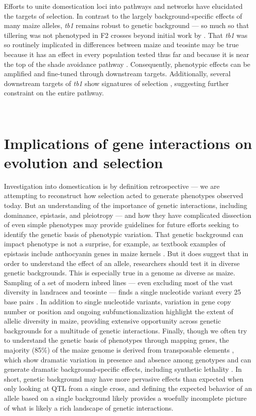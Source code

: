 \documentclass[9pt,twocolumn,twoside]{rilabRxiv}
\begin{document}
﻿Efforts to unite domestication loci into pathways and networks have elucidated the targets of selection.
In contrast to the largely background-specific effects of many maize alleles, \textit{tb1} remains robust to genetic background --- so much so that tillering was not phenotyped in F2 crosses beyond initial work by \citet{doebley1991}.
﻿That  \textit{tb1} was so routinely implicated in differences between maize and teosinte may be true because it has an effect in every population tested thus far and because it is near the top of the shade avoidance pathway \citep{studer2017}.
﻿Consequently, phenotypic effects can be amplified and fine-tuned through downstream targets.
Additionally, several downstream targets of \textit{tb1} show signatures of selection \citep{studer2017}, suggesting further constraint on the entire pathway.

﻿\section*{Implications of gene interactions on evolution and selection}

﻿Investigation into domestication is by definition retrospective --- we are attempting to reconstruct how selection acted to generate phenotypes observed today.
But an understanding of the importance of genetic interactions, including dominance, epistasis, and pleiotropy --- and how they have complicated dissection of even simple phenotypes may provide guidelines for future efforts seeking to identify the genetic basis of phenotypic variation.
That genetic background can impact phenotype is not a surprise, for example, as textbook examples of epistasis include anthocyanin genes in maize kernels \citep{coe1988}.
But it does suggest that in order to understand the effect of an allele, researchers should test it in diverse genetic backgrounds.
This is especially true in a genome as diverse as maize.
Sampling of a set of modern inbred lines --- even excluding most of the vast diversity in landraces and teosinte --- finds a single nucleotide variant every 25 base pairs \citep{bukowski2015}.
In addition to single nucleotide variants, variation in gene copy number \citep{swanson2010} or position \citep{liu2012} and ongoing
 subfunctionalization \citep{pophaly2015} highlight the extent of allelic diversity in maize, providing extensive opportunity across genetic backgrounds for a multitude of  genetic interactions.
Finally, though we often try to understand the genetic basis of phenotypes through mapping genes, the majority (85\%) of the maize genome is derived from transposable elements \citep{schnable2009}, which show dramatic variation in presence and absence among genotypes \citep{wang2006} and can generate  dramatic background-specific effects, including synthetic lethality \citep{gutierreznava1998}.
In short, genetic background may have more pervasive effects than expected when only looking at QTL from a single cross, and defining the expected behavior of an allele based on a single background likely provides a woefully incomplete picture of what is likely a rich landscape of genetic interactions.
\end{document}
